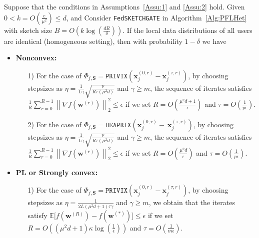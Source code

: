 \begin{theorem}\label{thm:hetreg_case}
  Suppose that the conditions in Assumptions~\ref{Assu:1} and \ref{Assu:2} hold. Given $0<k=O\left(\frac{e}{\mu^2}\right)\leq d$, and Consider \texttt{FedSKETCHGATE} in Algorithm~\ref{Alg:PFLHet} with sketch size $B=O\left(k\log\left(\frac{d R}{\delta}\right)\right)$. If the local data distributions of all users are identical (homogeneous setting), then with probability $1-\delta$ we have  
 \begin{itemize}
     \item \textbf{Nonconvex:}  
     \begin{itemize}
         \item [1)] For the case of $\Phi_{j,\mathbf{S}}=\texttt{PRIVIX}\left(\boldsymbol{x}_j^{(0,r)}-\boldsymbol{x}_j^{(\tau,r)}\right)$, by choosing stepsizes as $\eta=\frac{1}{L\gamma}\sqrt{\frac{p}{R\tau\left(\mu^2d\right)}}$ and $\gamma\geq m$, the sequence of iterates satisfies  $\frac{1}{R}\sum_{r=0}^{R-1}\left\|\nabla f({\boldsymbol{w}}^{(r)})\right\|_2^2\leq {\epsilon}$ if we set
     $R=O\left(\frac{\mu^2d+1}{\epsilon}\right)$ and $ \tau=O\left(\frac{1}{{p}\epsilon}\right)$.
         \item[2)] For the case of 
$  \Phi_{j,\mathbf{S}}=\texttt{HEAPRIX}\left(\boldsymbol{x}_j^{(0,r)}-~{\boldsymbol{x}}_{j}^{(\tau,r)}\right)$, by choosing stepsizes as $\eta=\frac{1}{L\gamma}\sqrt{\frac{p}{R\tau\left(\mu^2d\right)}}$ and $\gamma\geq m$, the sequence of iterates satisfies  $\frac{1}{R}\sum_{r=0}^{R-1}\left\|\nabla f({\boldsymbol{w}}^{(r)})\right\|_2^2\leq {\epsilon}$ if we set
     $R=O\left(\frac{\mu^2d}{\epsilon}\right)$ and $ \tau=O\left(\frac{1}{{p}\epsilon}\right)$. 
     \end{itemize}
     
     \item \textbf{PL or Strongly convex:}
      \begin{itemize}
          \item[1)] For the case of $\Phi_{j,\mathbf{S}}=\texttt{PRIVIX}\left(\boldsymbol{x}_j^{(0,r)}-\boldsymbol{x}_j^{(\tau,r)}\right)$, by choosing stepsizes as $\eta=\frac{1}{2L\left({\mu^2d}+1\right)\tau\gamma}$ and $\gamma\geq m$, we obtain that the iterates satisfy $\mathbb{E}\Big[f({\boldsymbol{w}}^{(R)})-f({\boldsymbol{w}}^{(*)})\Big]\leq \epsilon$ if  we set
     $R=O\left(\left(\mu^2d+1\right)\kappa\log\left(\frac{1}{\epsilon}\right)\right)$ and $ \tau=O\left(\frac{1}{m\epsilon}\right)$.
          

\end{itemize}
\end{itemize}
\end{theorem}
